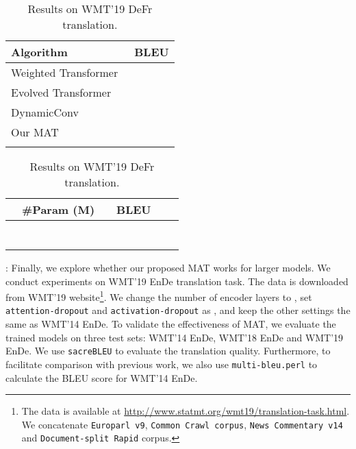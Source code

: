 \documentclass{article}
\begin{document}
\begin{table}[!htbp]
\vspace{-3mm}
\begin{minipage}{0.49\linewidth}
\vspace{-4mm}
\centering
\caption{BLEU scores of WMT'14 EnDe \\ in previous work.}
\begin{tabular}{lc}
\toprule
Algorithm & BLEU \\
\midrule
Weighted Transformer~\cite{ahmed2017weighted}&  \\
Evolved Transformer~\cite{so2019evolved} &  \\
DynamicConv~\cite{wu2019pay} &  \\
\midrule
Our MAT & \\
\bottomrule
\label{tab:prev_wmt14_en2de}
\end{tabular}
\end{minipage}
\hfill
\begin{minipage}{0.49\linewidth}
\centering
\caption{Results on WMT'19 DeFr translation.}
\begin{tabular}{lccccc}
\toprule
 & \#Param (M) &  & BLEU  \\
\midrule
 &  &  &   \\
 &  &  &   \\
\midrule
 &  &  &   \\
 &  &  &  \\
 &  &  &  \\
 &  &  &  \\
\bottomrule
\label{tab:wmt19_de2fr}
\end{tabular}
\end{minipage}
\vspace{-3mm}
\end{table}

: Finally, we explore whether our proposed MAT works for larger models. We conduct experiments on WMT'19 EnDe translation task. The data is downloaded from WMT'19 website\footnote{The data is available at \url{http://www.statmt.org/wmt19/translation-task.html}. We concatenate \texttt{Europarl v9}, \texttt{Common Crawl corpus}, \texttt{News Commentary v14} and \texttt{Document-split Rapid} corpus. }. We change the number of encoder layers to , set \texttt{attention-dropout} and \texttt{activation-dropout} as , and keep the other settings the same as WMT'14 EnDe. To validate the effectiveness of MAT, we evaluate the trained models on three test sets: WMT'14 EnDe, WMT'18 EnDe and WMT'19 EnDe. We use \texttt{sacreBLEU} to evaluate the translation quality. Furthermore, to facilitate comparison with previous work, we also use \texttt{multi-bleu.perl} to calculate the BLEU score for WMT'14 EnDe.
\end{document}
